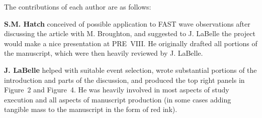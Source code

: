 The contributions of each author are as follows:

\textbf{S.M. Hatch} conceived of possible application to FAST \Alf
wave observations after discussing the article with M. Broughton, and
suggested to J. LaBelle the project would make a nice presentation at
PRE~VIII. He originally drafted all portions of the manuscript, which
were then heavily reviewed by J. LaBelle.

\textbf{J. LaBelle} helped with suitable event selection, wrote
substantial portions of the introduction and parts of the discussion,
and produced the top right panels in Figure~2 and Figure~4. He was
heavily involved in most aspects of study execution and all aspects of
manuscript production (in some cases adding tangible mass to the
manuscript in the form of red ink).



\restoregeometry
    
